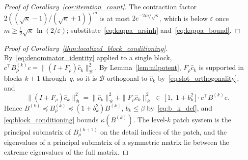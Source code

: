 \documentclass[hidelinks]{siamart}
\theoremstyle{nonumberplain}
\numberwithin{theorem}{section}
\begin{document}
\begin{proof}[Proof of Corollary~\textup{\ref{cor:iteration_count}}]
The contraction factor $2((\sqrt{\kappa}-1)/(\sqrt{\kappa}+1))^m$ is at
most $2 e^{-2m/\sqrt{\kappa}}$, which is below $\varepsilon$ once
$m \geq \tfrac12 \sqrt{\kappa}\, \ln(2/\varepsilon)$;
substitute~\eqref{eq:kappa_arsinh} and~\eqref{eq:kappa_bound}.
\end{proof}

\begin{proof}[Proof of Corollary~\textup{\ref{thm:localized_block_conditioning}}]
By~\eqref{eq:denominator_identity} applied to a single block,
$c^\top B^{(k)}_\rho c = \|(I+F_\rho)\hat{c}_k\|_{\mathcal{B}}^2$.  By
Lemma~\ref{lem:nilpotent}, $F_\rho \hat{c}_k$ is supported in blocks
$k+1$ through~$q$, so it is $\mathcal{B}$-orthogonal to $\hat{c}_k$
by~\eqref{eq:slot_orthogonality}, and
\[
  \|(I+F_\rho)\hat{c}_k\|_{\mathcal{B}}^2
  = \|\hat{c}_k\|_{\mathcal{B}}^2 + \|F_\rho \hat{c}_k\|_{\mathcal{B}}^2
  \;\in\; \bigl[\, 1,\; 1 + b_k^2 \,\bigr] \cdot c^\top B^{(k)} c .
\]
Hence $B^{(k)} \preceq B^{(k)}_\rho \preceq (1 + b_k^2) B^{(k)}$,
$b_k \leq \beta$ by~\eqref{eq:b_k_def}, and
\eqref{eq:block_conditioning} bounds $\kappa(B^{(k)})$.  The
level-$k$ patch system is the principal submatrix of $B^{(k+1)}_\rho$
on the detail indices of the patch, and the eigenvalues of a principal
submatrix of a symmetric matrix lie between the extreme eigenvalues of
the full matrix.
\end{proof}
\end{document}
